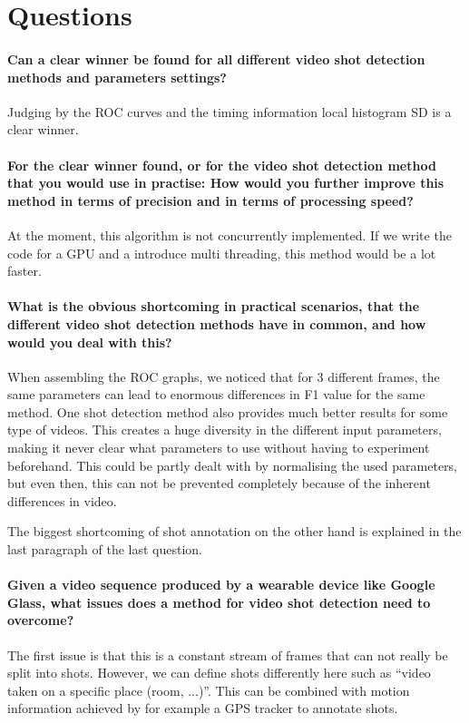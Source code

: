 \documentclass[a4paper,10pt]{article}
\begin{document}
\section{Questions}
\paragraph{Can a clear winner be found for all different video shot detection methods and parameters settings?} Judging by the ROC curves and the timing information local histogram SD is a clear winner.

\paragraph{For the clear winner found, or for the video shot detection method that you would use in practise: How would you further improve this method in terms of precision and in terms of processing speed?} At the moment, this algorithm is not concurrently implemented. If we write the code for a GPU and a introduce multi threading, this method would be a lot faster.

\paragraph{What is the obvious shortcoming in practical scenarios, that the different video shot detection methods have in common, and how would you deal with this?}
When assembling the ROC graphs, we noticed that for 3 different frames, the same parameters can lead to enormous differences in F1 value for the same method. One shot detection method also provides much better results for some type of videos. This creates a huge diversity in the different input parameters, making it never clear what parameters to use without having to experiment beforehand. This could be partly dealt with by normalising the used parameters, but even then, this can not be prevented completely because of the inherent differences in video.

The biggest shortcoming of shot annotation on the other hand is explained in the last paragraph of the last question.

\paragraph{Given a video sequence produced by a wearable device like Google Glass, what issues does a method for video shot detection need to overcome?}
The first issue is that this is a constant stream of frames that can not really be split into shots. However, we can define shots differently here such as ``video taken on a specific place (room, ...)''. This can be combined with motion information achieved by for example a GPS tracker to annotate shots. 
\end{document}
